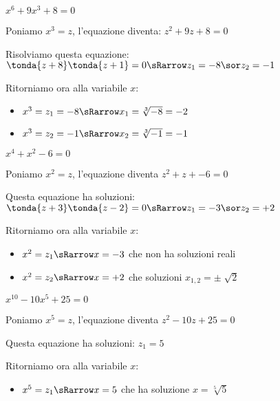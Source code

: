 \begin{comment}
\begin{esempio}

\begin{center}
\begin{tabular}{ll}
: & \\
: & \\
: & 
\end{tabular}
\end{center}
\end{esempio}
\end{comment}

\begin{esempio}
  $x^6+9x^3+8=0$

  Poniamo $x^3=z$, l'equazione diventa: $z^2+9z+8=0$

  Risolviamo questa equazione: 
  $\tonda{z+8}\tonda{z+1}=0 \sRarrow z_1=-8 \sor z_2=-1$

  Ritorniamo ora alla variabile $x$:
  \begin{itemize} [nosep]
    \item $x^3=z_1=-8 \sRarrow x_1=\sqrt[3]{-8}=-2$ 
    \item $x^3=z_2=-1 \sRarrow x_2=\sqrt[3]{-1}=-1$
  \end{itemize}
\end{esempio}

\begin{esempio}
  $x^4+x^2-6=0$
  
  Poniamo $x^2=z$, l'equazione diventa $z^2+z+-6=0$ 
  
  Questa equazione ha soluzioni:
  $\tonda{z+3}\tonda{z-2}=0 \sRarrow z_1=-3 \sor z_2=+2$
  
  Ritorniamo ora alla variabile $x$:
  \begin{itemize} [nosep]
    \item $x^2=z_1 \sRarrow x=-3$ che non ha soluzioni reali
    \item $x^2=z_2 \sRarrow x=+2$ che soluzioni $x_{1,2}=\pm \sqrt[]{2}$
  \end{itemize}
\end{esempio}

\begin{esempio}
  $x^{10}-10x^5+25=0$ 
  
  Poniamo $x^5=z$, l'equazione diventa $z^2-10z+25=0$
  
  Questa equazione ha soluzioni:
  $z_1=5$
  
  Ritorniamo ora alla variabile $x$:
  \begin{itemize} [nosep]
    \item $x^5=z_1 \sRarrow x=5$ che ha soluzione $x=\sqrt[5]{5}$
  \end{itemize}
\end{esempio}